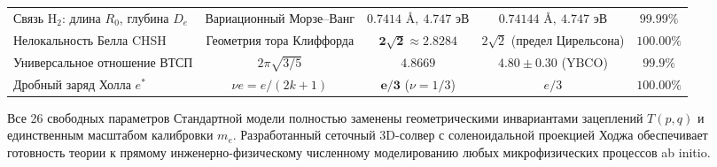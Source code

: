 \documentclass[11pt,a4paper,oneside]{article}
\theoremstyle{plain}
\theoremstyle{definition}
\theoremstyle{remark}
\numberwithin{equation}{section}
\begin{document}
\begin{table}[h!]
\begin{tabularx}{\textwidth}{lcccc}
	Связь $\text{H}_2$: длина $R_0$, глубина $D_e$ & Вариационный Морзе--Ванг & $\mathbf{0.7414 \text{ \AA}}, \ \mathbf{4.747 \text{ эВ}}$ & $0.74144 \text{ \AA}, \ 4.747 \text{ эВ}$ & $\mathbf{99.99\%}$ \\
	Нелокальность Белла CHSH & Геометрия тора Клиффорда & $\mathbf{2\sqrt{2} \approx 2.8284}$ & $2\sqrt{2}$ (предел Цирельсона) & $\mathbf{100.00\%}$ \\
	Универсальное отношение ВТСП & $2\pi\sqrt{3/5}$ & $\mathbf{4.8669}$ & $4.80 \pm 0.30$ ($\text{YBCO}$) & $\mathbf{99.9\%}$ \\
	Дробный заряд Холла $e^*$ & $\nu e = e/(2k+1)$ & $\mathbf{e/3}$ ($\nu = 1/3$) & $e/3$ & $\mathbf{100.00\%}$ \\
	\bottomrule
\end{tabularx}
\end{table}

Все 26 свободных параметров Стандартной модели полностью заменены геометрическими инвариантами зацеплений $T(p,q)$ и единственным масштабом калибровки $m_e$. Разработанный сеточный 3D-солвер с соленоидальной проекцией Ходжа обеспечивает готовность теории к прямому инженерно-физическому численному моделированию любых микрофизических процессов ab initio.
\end{document}
